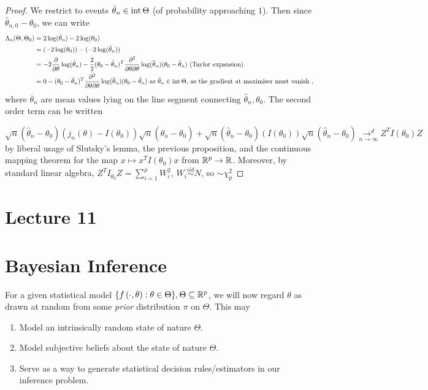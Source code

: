 \documentclass[a4paper]{article}
\begin{document}
\begin{proof}
	We restrict to events $\hat{\theta}_n \in\operatorname{int} \Theta$ (of probability approaching $1$). Then since $\hat{\theta}_{n,0} - \theta_0$, we can write 
	\begin{align*}
		\Lambda_n(\Theta,\Theta_0) &= 2\log(\hat{\theta}_n) - 2\log(\theta_0) \\
		&= (-2\log(\theta_0)) -(-2\log(\hat{\theta}_n)) \\
		&= -2 \frac{\partial }{\partial \theta} \log(\hat{\theta}_n) - \frac{2}{2} (\theta_0 - \hat{\theta}_n)^{T} \frac{\partial ^2}{\partial \theta\partial\theta} \log(\overline{\theta}_n)(\theta_0 - \hat{\theta}_n) \text{ (Taylor expansion)} \\ 
		&= 0 - (\theta_0 - \hat{\theta}_n)^{T} \frac{\partial ^2}{\partial \theta\partial\theta} \log(\overline{\theta}_n)(\theta_0 - \hat{\theta}_n) \text{ as $\hat{\theta}_n \in\operatorname{int} \Theta$, as the gradient at maximiser must vanish }
	,\end{align*}
	where $\overline{\theta}_n$ are mean values lying on the line segment connecting $\hat{\theta}_n, \theta_0$. The second order term can be written

\[
	\sqrt{n}(\hat{\theta}_n - \theta_0)(j_n(\theta) - I(\theta_0))\sqrt{n}(\hat{\theta}_n - \theta_0) + \sqrt{n}(\hat{\theta}_n - \theta_0)(I(\theta_0))\sqrt{n}(\hat{\theta}_n - \theta_0) \underset{n\to \infty}{\to ^{d}} Z^{T}I(\theta_0)Z
		\]
by liberal usage of Slutsky's lemma, the previous proposition, and the continuous mapping theorem for the map $x \mapsto x^{T}I(\theta_0)x$ from $\mathbb{R}^{p} \to \mathbb{R}$. Moreover, by standard linear algebra, $Z^{T}I_{\theta_0}Z = \sum_{i=1}^{p} W_{i}^2$, $W_i \stackrel{iid}{\sim} N$, so $\sim \chi^2_{p}$ 
\end{proof}

\section*{Lecture 11}

\section{Bayesian Inference}

For a given statistical model $\{f\left( \cdot , \theta \right) : \theta \in \Theta \}, \Theta \subseteq \mathbb{R}^{p}$, we will now regard $\theta$ as drawn at random from some \textit{prior} distribution $\pi$ on $\Theta$. This may

\begin{enumerate}[label=\roman*)]
	\item Model an intrinsically random state of nature $\Theta$.
	\item Model subjective beliefs about the state of nature $\Theta$.
	\item Serve as a way to generate statistical decision rules/estimators in our inference problem.
\end{enumerate}
\end{document}
